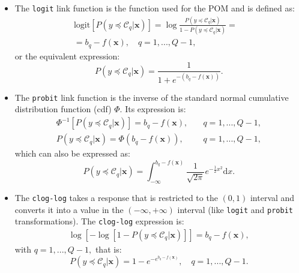 \documentclass[preprint]{elsarticle}
\begin{document}
\begin{itemize}
	\item The \texttt{logit} link function is the function used for the POM and is defined as:
	\begin{equation}
	\nonumber
	\begin{aligned}
	\text{logit}[P(y \preceq \mathcal{C}_q | \mathbf{x})] = \log\frac{P(y \preceq \mathcal{C}_q | \mathbf{x})}{1 - P(y \preceq \mathcal{C}_q | \mathbf{x})}=& \\ = b_q - f(\mathbf{x}), \quad q = 1, ..., Q-1,
	\end{aligned}
	\label{eq:logit}
	\end{equation}		
	or the equivalent expression:		
	\begin{equation}
	\nonumber
	P(y \preceq \mathcal{C}_q | \mathbf{x}) = \frac{1}{1 + e^{-(b_q - f(\mathbf{x}))}}.
	\label{eq:logit2}
	\end{equation}
	
	\item The \texttt{probit} link function is the inverse of the standard normal cumulative distribution function (cdf) $\Phi$. Its expression is:
	\begin{equation}
	\nonumber
	\begin{aligned}
	\Phi^{-1}[P(y \preceq \mathcal{C}_q | \mathbf{x})] = b_q - f(\mathbf{x}), \quad &q = 1, ..., Q-1,\\
	P(y \preceq \mathcal{C}_q | \mathbf{x}) = \Phi(b_q - f(\mathbf{x})), \quad &q = 1, ..., Q-1,
	\end{aligned}
	\label{eq:probit}
	\end{equation}		
	which can also be expressed as:
	\begin{equation}
	\nonumber
	P(y \preceq \mathcal{C}_q | \mathbf{x}) = \int_{-\infty}^{b_q - f(\mathbf{x})} \frac{1}{\sqrt{2\pi}} e^{-\frac{1}{2}x^2} \mathrm{d}x.
	\label{eq:probit2}
	\end{equation}
	
	\item The \texttt{clog-log} takes a response that is restricted to the $(0,1)$ interval and converts it into a value in the $(-\infty, +\infty)$ interval (like \texttt{logit} and \texttt{probit} transformations). The \texttt{clog-log} expression is:
	\begin{equation}
	\nonumber
	\begin{aligned}
	\log[-\log[1 - P(y \preceq \mathcal{C}_q | \mathbf{x})]] =b_q - f(\mathbf{x}),
	\end{aligned}
	\label{eq:cloglog}
	\end{equation}
	with $q = 1, ..., Q-1,$ that is:
	\begin{equation}
	\nonumber
	P(y \preceq \mathcal{C}_q | \mathbf{x}) = 1 - e^{-e^{b_q - f(\mathbf{x})}}, \quad q = 1, ..., Q-1.
	\label{eq:cloglog2}
	\end{equation}
\end{itemize}
\end{document}
